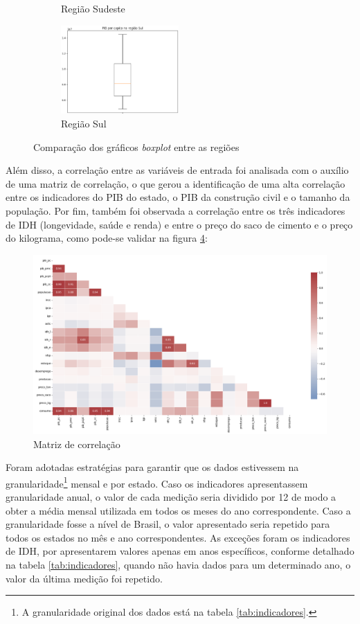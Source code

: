 \begin{figure}[H]
\begin{subfigure}{5cm}
        \caption{Região Sudeste}
        \label{fig:boxplot-se}
    \end{subfigure}
    \begin{subfigure}{5cm}
        \centering 
        \includegraphics[width=4.5cm]{../figuras/graficos/boxplot-pib-cc-s.png}
        \caption{Região Sul}
        \label{fig:boxplot-s}
    \end{subfigure}
    \caption{Comparação dos gráficos \textit{boxplot} entre as regiões}
  \end{figure}

Além disso, a correlação entre as variáveis de entrada foi analisada com o auxílio 
de uma matriz de correlação, o que gerou a identificação de uma 
alta correlação entre os indicadores do PIB do estado, o PIB da construção
civil e o tamanho da população. Por fim, também foi observada a correlação entre os três indicadores
de IDH (longevidade, saúde e renda) e entre o preço do saco de cimento e o preço do kilograma, como pode-se
validar na figura \ref{fig:matriz-corr}:

\begin{figure}[H]
    \centering
    \includegraphics[width=13cm]{../figuras/graficos/matriz-corr.png}
    \caption{Matriz de correlação}
    \label{fig:matriz-corr}
\end{figure}

Foram adotadas estratégias para garantir que os dados estivessem na granularidade\footnote{A granularidade original dos dados está na tabela \ref{tab:indicadores}.}
mensal e por estado. Caso os indicadores apresentassem granularidade anual, o valor de
cada medição seria dividido por 12 de modo a obter a média mensal utilizada em 
todos os meses do ano correspondente. Caso a granularidade
fosse a nível de Brasil, o valor apresentado seria repetido para todos os 
estados no mês e ano correspondentes. As exceções foram os 
indicadores de IDH, por apresentarem valores apenas em anos específicos, conforme 
detalhado na tabela \ref{tab:indicadores}, quando não havia dados para um 
determinado ano, o valor da última medição foi repetido.

